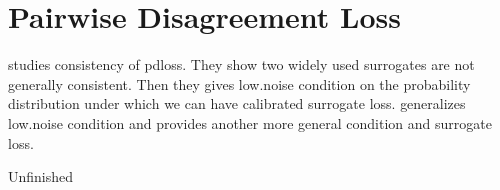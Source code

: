\section{Pairwise Disagreement Loss}\label{sec:pdloss}

\cite{duchi} studies consistency of pdloss. They show two widely used surrogates are not generally consistent. Then they gives low.noise condition on the probability distribution under which we can have calibrated surrogate loss. \cite{ramaswamy2013convex} generalizes low.noise condition and provides another more general condition and surrogate loss. 

Unfinished
